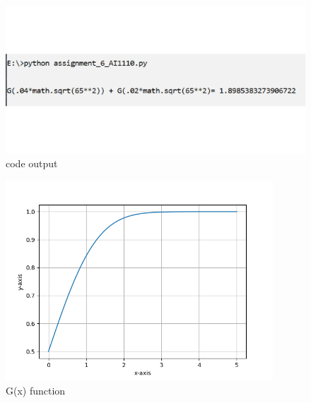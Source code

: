 \documentclass{beamer}
\begin{document}
\begin{frame}
    \begin{figure}[htb!]
\includegraphics[width=12cm]{figures/assignment_6_output.png}
\caption{code output}
\end{figure}

\end{frame}
\begin{frame}
    \begin{figure}[htb!]

\includegraphics[width=10cm]{figures/G(x)_function.png}
\caption{G(x) function}
\end{figure}

\end{frame}
\end{document}
